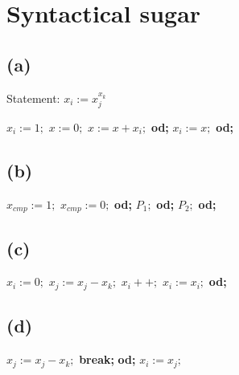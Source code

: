 

\usepackage{algorithm}
\usepackage[noend]{algpseudocode}

\setcounter{section}{1}

\section{Syntactical sugar}

\subsection{(a)}

Statement: \( x_i := x_j^{x_k} \)

\begin{algorithmic}[1]
\State \( x_i := 1; \)
    \State \( x := 0; \)
        \State \( x := x + x_i; \)
    \EndFor \textbf{od;}
    \State \( x_i := x; \)
\EndFor \textbf{od;}
\end{algorithmic}


\subsection{(b)}

\begin{algorithmic}[1]
\State \( x_{cmp} := 1; \)  
    \State \( x_{cmp} := 0; \) 
\EndFor \textbf{od;}
     \( P_1; \)
\EndFor \textbf{od;}
    \State\( P_2; \)
\EndFor \textbf{od;}
\end{algorithmic}


\subsection{(c)}

\begin{algorithmic}[1]
\State \( x_i := 0; \)
        \State \( x_j := x_j - x_k; \)
        \State \( x_i++; \)
    \Else
        \State \(x_i := x_i;\)
    \EndIf
\EndFor \textbf{od;}
\end{algorithmic}

\subsection{(d)}

\begin{algorithmic}[1]

        \State \( x_j := x_j - x_k; \)
    \Else
        \State \textbf{break;}
    \EndIf
\EndFor \textbf{od;}
\State \( x_i := x_j; \) 
\end{algorithmic}


